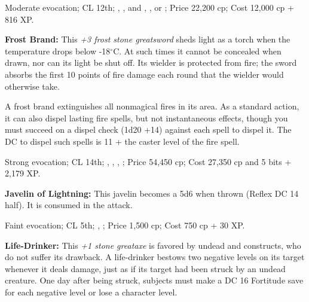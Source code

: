Moderate evocation; CL 12th; , , and , , or ; Price 22,200 cp; Cost 12,000 cp + 816 XP.

\textbf{Frost Brand:} This \emph{+3 frost stone greatsword} sheds light as a torch when the temperature drops below -18$^\circ$C. At such times it cannot be concealed when drawn, nor can its light be shut off. Its wielder is protected from fire; the sword absorbs the first 10 points of fire damage each round that the wielder would otherwise take.

A frost brand extinguishes all nonmagical fires in its area. As a standard action, it can also dispel lasting fire spells, but not instantaneous effects, though you must succeed on a dispel check (1d20 +14) against each spell to dispel it. The DC to dispel such spells is 11 + the caster level of the fire spell.

Strong evocation; CL 14th; , , , ; Price 54,450 cp; Cost 27,350 cp and 5 bits + 2,179 XP.




\textbf{Javelin of Lightning:} This javelin becomes a 5d6  when thrown (Reflex DC 14 half). It is consumed in the attack.

Faint evocation; CL 5th; , ; Price 1,500 cp; Cost 750 cp + 30 XP.

\textbf{Life-Drinker:} This \emph{+1 stone greataxe} is favored by undead and constructs, who do not suffer its drawback. A life-drinker bestows two negative levels on its target whenever it deals damage, just as if its target had been struck by an undead creature. One day after being struck, subjects must make a DC 16 Fortitude save for each negative level or lose a character level.

